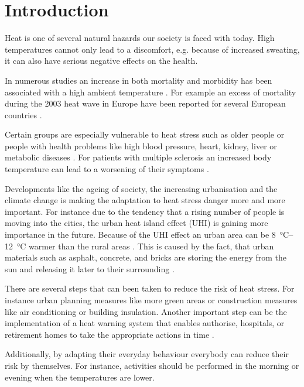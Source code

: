 
\section{Introduction}

Heat is one of several natural hazards our society is faced with today. High temperatures cannot only lead to a discomfort, e.g. because of increased sweating, it can also have serious negative effects on the health. 

In numerous studies an increase in both mortality and
morbidity has been associated with a high ambient temperature \parencite{Basu2009}. For example an excess of mortality during the 2003 heat wave in Europe have been reported for several European countries \parencite{Kovats2004}. 

Certain groups are especially vulnerable to heat stress such as older people or people with health problems like high blood pressure,  heart, kidney, liver or
metabolic diseases  \parencite{Ebi2004,Huebler2007}. For patients with multiple sclerosis an increased body temperature can lead to a worsening of their symptoms \parencite{Davis2010}.

Developments like the ageing of society, the increasing urbanisation and the climate change is making the adaptation to heat stress danger more and more important. For instance due to the tendency that a rising number of people is moving into the cities, the urban heat island effect (UHI) is gaining more importance in the future. Because of the UHI effect an urban area can be  \SIrange{8}{12}{\celsius} warmer than the rural areas \parencite{Prashad2014}. This is caused by the fact, that urban materials such as asphalt, concrete, and bricks are storing the energy from the sun and releasing it later to their surrounding \parencite{Prashad2014}. 

There are several steps that can been taken to reduce the risk of heat stress. For instance urban planning measures like more green areas or construction measures like air conditioning or building insulation. Another important step can be the implementation of a heat warning system that enables authorise, hospitals, or retirement homes to take the appropriate actions in time \parencite{Ebi2004}.

Additionally, by adapting their everyday behaviour everybody can reduce their risk by themselves. For instance, activities should be performed in the morning or evening when the temperatures are lower.

